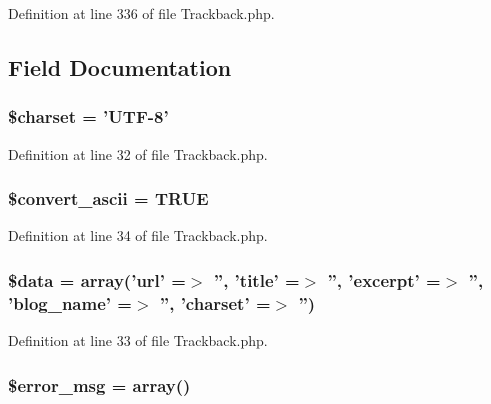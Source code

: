 Definition at line 336 of file Trackback.\-php.



\subsection{Field Documentation}
\hypertarget{class_c_i___trackback_af10158dd74b75f1d337e83102d6b82ce}{
\subsubsection[{\$charset}]{\setlength{\rightskip}{0pt plus 5cm}\$charset = 'U\-T\-F-\/8'}}\label{class_c_i___trackback_af10158dd74b75f1d337e83102d6b82ce}


Definition at line 32 of file Trackback.\-php.

\hypertarget{class_c_i___trackback_a488490c694dfefb9578fb22e0208e008}{
\subsubsection[{\$convert\-\_\-ascii}]{\setlength{\rightskip}{0pt plus 5cm}\${\bf convert\-\_\-ascii} = T\-R\-U\-E}}\label{class_c_i___trackback_a488490c694dfefb9578fb22e0208e008}


Definition at line 34 of file Trackback.\-php.

\hypertarget{class_c_i___trackback_a6efc15b5a2314dd4b5aaa556a375c6d6}{
\subsubsection[{\$data}]{\setlength{\rightskip}{0pt plus 5cm}\${\bf data} = array('url' =$>$ '', 'title' =$>$ '', 'excerpt' =$>$ '', 'blog\-\_\-name' =$>$ '', 'charset' =$>$ '')}}\label{class_c_i___trackback_a6efc15b5a2314dd4b5aaa556a375c6d6}


Definition at line 33 of file Trackback.\-php.

\hypertarget{class_c_i___trackback_acf910733622c1fa671b9f755c69c2ec7}{
\subsubsection[{\$error\-\_\-msg}]{\setlength{\rightskip}{0pt plus 5cm}\$error\-\_\-msg = array()}}\label{class_c_i___trackback_acf910733622c1fa671b9f755c69c2ec7}



